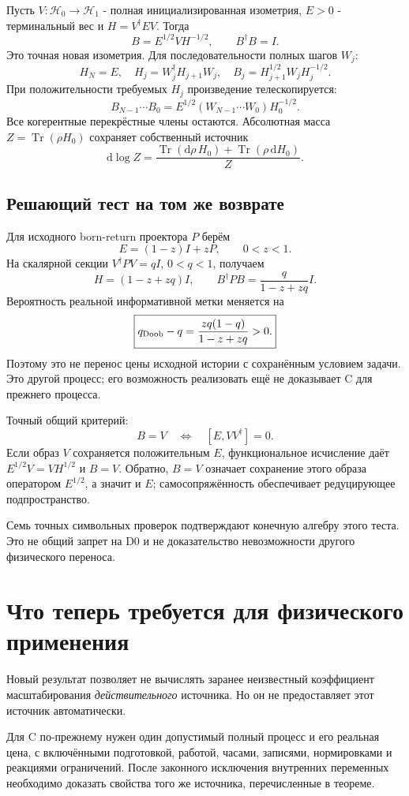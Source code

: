 \documentclass[11pt,a4paper]{article}
\newcommand{\dd}{\mathrm d}
\DeclareMathOperator{\Tr}{Tr}
\begin{document}
Пусть $V:\mathcal H_0\to\mathcal H_1$ - полная инициализированная изометрия, $E>0$ - терминальный вес и $H=V^\dagger EV$. Тогда
\[
B=E^{1/2}VH^{-1/2},\qquad B^\dagger B=I.
\]
Это точная новая изометрия. Для последовательности полных шагов $W_j$:
\[
H_N=E,\quad H_j=W_j^\dagger H_{j+1}W_j,\quad
B_j=H_{j+1}^{1/2}W_jH_j^{-1/2}.
\]
При положительности требуемых $H_j$ произведение телескопируется:
\[
B_{N-1}\cdots B_0=
E^{1/2}(W_{N-1}\cdots W_0)H_0^{-1/2}.
\]
Все когерентные перекрёстные члены остаются. Абсолютная масса
$Z=\Tr(\rho H_0)$ сохраняет собственный источник
\[
\dd\log Z=\frac{\Tr(\dd\rho\,H_0)+\Tr(\rho\,\dd H_0)}{Z}.
\]

\subsection{Решающий тест на том же возврате}
Для исходного born-return проектора $P$ берём
\[
E=(1-z)I+zP,\qquad 0<z<1.
\]
На скалярной секции $V^\dagger PV=qI$, $0<q<1$, получаем
\[
H=(1-z+zq)I,\qquad
B^\dagger PB=\frac{q}{1-z+zq}I.
\]
Вероятность реальной информативной метки меняется на
\[
\boxed{q_{\rm Doob}-q=
\frac{zq(1-q)}{1-z+zq}>0.}
\]
Поэтому это не перенос цены исходной истории с сохранённым условием задачи. Это другой процесс; его возможность реализовать ещё не доказывает C для прежнего процесса.

Точный общий критерий:
\[
B=V\quad\Longleftrightarrow\quad [E,VV^\dagger]=0.
\]
Если образ $V$ сохраняется положительным $E$, функциональное исчисление даёт
$E^{1/2}V=VH^{1/2}$ и $B=V$. Обратно, $B=V$ означает сохранение этого образа оператором $E^{1/2}$, а значит и $E$; самосопряжённость обеспечивает редуцирующее подпространство.

Семь точных символьных проверок подтверждают конечную алгебру этого теста. Это не общий запрет на D0 и не доказательство невозможности другого физического переноса.

\section{Что теперь требуется для физического применения}
Новый результат позволяет не вычислять заранее неизвестный коэффициент масштабирования \emph{действительного} источника. Но он не предоставляет этот источник автоматически.

Для C по-прежнему нужен один допустимый полный процесс и его реальная цена, с включёнными подготовкой, работой, часами, записями, нормировками и реакциями ограничений. После законного исключения внутренних переменных необходимо доказать свойства того же источника, перечисленные в теореме.
\end{document}

